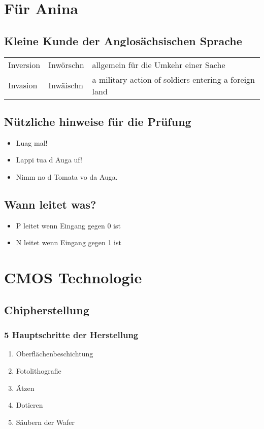 \section{Für Anina}
\subsection{Kleine Kunde der Anglosächsischen Sprache}
\begin{tabular}{lll}
	Inversion & Inwörschn & allgemein für die Umkehr einer Sache \\
	Invasion & Inwäischn & a military action of soldiers entering a foreign land\\
\end{tabular}
\subsection{Nützliche hinweise für die Prüfung}
\begin{itemize}
  \item Luag mal!
  \item Lappi tua d Auga uf!
  \item Nimm no d Tomata vo da Auga.
\end{itemize}
\subsection{Wann leitet was?}
\begin{itemize}
  \item P leitet wenn Eingang gegen 0 ist
  \item N leitet wenn Eingang gegen 1 ist
\end{itemize}


\section{CMOS Technologie}
\subsection{Chipherstellung}
\subsubsection{5 Hauptschritte der Herstellung}
\begin{enumerate}
  \item Oberflächenbeschichtung
  \item Fotolithografie
  \item Ätzen
  \item Dotieren
  \item Säubern der Wafer
\end{enumerate}
